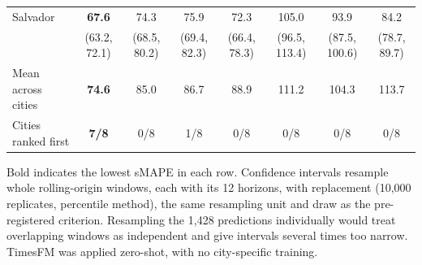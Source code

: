 \begin{table}[htbp]
\begin{tabular}{lccccccc}
Salvador & \textbf{67.6} & 74.3 & 75.9 & 72.3 & 105.0 & 93.9 & 84.2 \\
 & \tiny(63.2, 72.1) & \tiny(68.5, 80.2) & \tiny(69.4, 82.3) & \tiny(66.4, 78.3) & \tiny(96.5, 113.4) & \tiny(87.5, 100.6) & \tiny(78.7, 89.7) \\[2pt]
\midrule
Mean across cities & \textbf{74.6} & 85.0 & 86.7 & 88.9 & 111.2 & 104.3 & 113.7 \\
Cities ranked first & \textbf{7/8} & 0/8 & 1/8 & 0/8 & 0/8 & 0/8 & 0/8 \\
\bottomrule
\end{tabular}

\vspace{0.5em}
\begin{minipage}{\textwidth}
\footnotesize
Bold indicates the lowest sMAPE in each row. Confidence intervals resample whole
rolling-origin windows, each with its 12 horizons, with replacement (10{,}000 replicates,
percentile method), the same resampling unit and draw as the pre-registered criterion.
Resampling the 1{,}428 predictions individually would treat overlapping windows as
independent and give intervals several times too narrow. TimesFM was applied zero-shot,
with no city-specific training.
\end{minipage}
\end{table}
